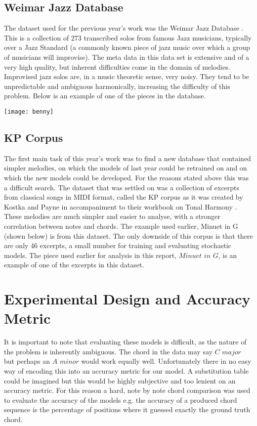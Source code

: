\documentclass[bsc,singlespacing,logo, parskip, deptreport]{infthesis}
\begin{document}
\subsection{Weimar Jazz Database} \label{wjazz}
The dataset used for the previous year's work was the Weimar Jazz Database \cite{wjazz}. This is a collection of 273 transcribed solos from famous Jazz musicians, typically over a Jazz Standard (a commonly known piece of jazz music over which a group of musicians will improvise). The meta data in this data set is extensive and of a very high quality, but inherent difficulties come in the domain of melodies. Improvised jazz solos are, in a music theoretic sense, very noisy. They tend to be unpredictable and ambiguous harmonically, increasing the difficulty of this problem. Below is an example of one of the pieces in the database.

\texttt{[image: benny]}

\subsection{KP Corpus} \label{kp}
The first main task of this year's work was to find a new database that contained simpler melodies, on which the models of last year could be retrained on and on which the new models could be developed. For the reasons stated above this was a difficult search. The dataset that was settled on was a collection of excerpts from classical songs in MIDI format, called the KP corpus as it was created by Kostka and Payne in accompaniment to their workbook on Tonal Harmony \cite{kostka2009tonal}. These melodies are much simpler and easier to analyse, with a stronger correlation between notes and chords. The example used earlier, Minuet in G (shown below) is from this dataset. The only downside of this corpus is that there are only 46 excerpts, a small number for training and evaluating stochastic models. The piece used earlier for analysis in this report, $Minuet$ $in$ $G$, is an example of one of the excerpts in this dataset.

\section{Experimental Design and Accuracy Metric}

It is important to note that evaluating these models is difficult, as the nature of the problem is inherently ambiguous. The chord in the data may say $C$ $major$ but perhaps an $A$ $minor$ would work equally well. Unfortunately there in no easy way of encoding this into an accuracy metric for our model. A substitution table could be imagined but this would be highly subjective and too lenient on an accuracy metric. For this reason a hard, note by note chord comparison was used to evaluate the accuracy of the models e.g. the accuracy of a produced chord sequence is the percentage of positions where it guessed exactly the ground truth chord.
\end{document}
